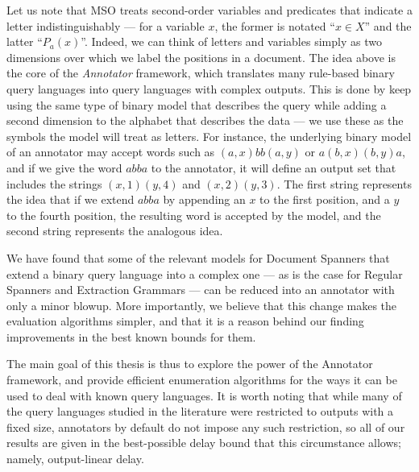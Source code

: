 
Let us note that MSO treats second-order variables and predicates that indicate a letter indistinguishably  --- for a variable $x$, the former is notated ``$x\in X$'' and the latter ``$P_{a}(x)$''. Indeed, we can think of letters and variables simply as two dimensions over which we label the positions in a document.  The idea above is the core of the {\it Annotator} framework, which translates many rule-based binary query languages into query languages with complex outputs. This is done by keep using the same type of binary model that describes the query while adding a second dimension to the alphabet that describes the data --- we use these as the symbols the model will treat as letters. For instance, the underlying binary model of an annotator may accept words such as  $(a,x)bb(a,y)$ or $a(b,x)(b,y)a$, and if we give the word $abba$ to the annotator, it will define an output set that includes the strings $(x,1)(y,4)$ and $(x,2)(y,3)$. The first string represents the idea that if we extend $abba$ by appending an $x$ to the first position, and a $y$ to the fourth position, the resulting word is accepted by the model, and the second string  represents the analogous idea.

We have found that some of the relevant models for Document Spanners that extend a binary query language into a complex one --- as is the case for Regular Spanners and Extraction Grammars --- can be reduced into an annotator with only a minor blowup. More importantly, we believe that this change makes the evaluation algorithms simpler, and that it is a reason behind our finding improvements in the best known bounds for them.

The main goal of this thesis is thus to explore the power of the Annotator framework, and provide efficient enumeration algorithms for the ways it can be used to deal with known query languages. It is worth noting that while many of the query languages studied in the literature were restricted to outputs with a fixed size, annotators by default do not impose any such restriction, so all of our results are given in the best-possible delay bound that this circumstance allows; namely, output-linear delay.

